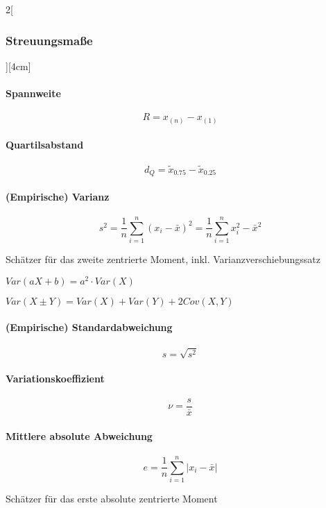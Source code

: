 \documentclass[8pt]{extarticle}
\begin{document}
\begin{multicols}{2}[\subsubsection{Streuungsmaße}][4cm] 

\paragraph{Spannweite}

$$R=x_{(n)}-x_{(1)}$$

\paragraph{Quartilsabstand}

$$d_Q=\tilde{x}_{0.75}-\tilde{x}_{0.25}$$

\paragraph{(Empirische) Varianz}

$$s^2=\frac{1}{n}\sum\limits_{i=1}^n(x_i-\bar{x})^2=\frac{1}{n}\sum\limits_{i=1}^nx_i^2-\bar{x}^2$$

\noindent Schätzer für das zweite zentrierte Moment, inkl. Varianzverschiebungssatz

\begin{Rechreg}
\item $Var(aX+b)=a^2\cdot Var(X)$
\item $Var(X\pm Y)= Var(X)+Var(Y) + 2Cov(X,Y)$
\end{Rechreg}

\paragraph{(Empirische) Standardabweichung}

$$s=\sqrt{s^2}$$

\paragraph{Variationskoeffizient}

$$ \nu=\frac{s}{\bar{x}}$$

\paragraph{Mittlere absolute Abweichung}


$$ \mathit{e} = \frac{1}{n}\sum_{i=1}^n \left|x_i - \bar{x}\right|$$

\noindent Schätzer für das erste absolute zentrierte Moment 

\end{multicols}
\end{document}
